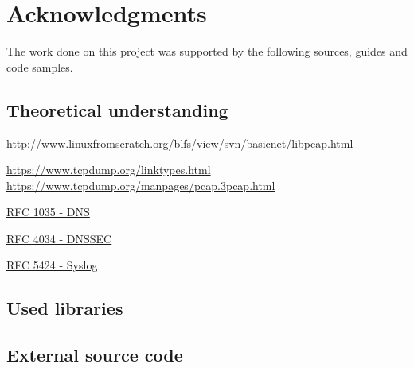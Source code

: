 
\section{Acknowledgments}

The work done on this project was supported by the following sources, guides and code samples.

\subsection{Theoretical understanding}

\url{http://www.linuxfromscratch.org/blfs/view/svn/basicnet/libpcap.html}

\url{https://www.tcpdump.org/linktypes.html}
\url{https://www.tcpdump.org/manpages/pcap.3pcap.html}

\href{https://www.ietf.org/rfc/rfc1035.txt}{RFC 1035 - DNS}

\href{https://www.ietf.org/rfc/rfc4034.txt}{RFC 4034 - DNSSEC}

\href{https://tools.ietf.org/html/rfc5424}{RFC 5424 - Syslog}

\subsection{Used libraries}
\subsection{External source code}
